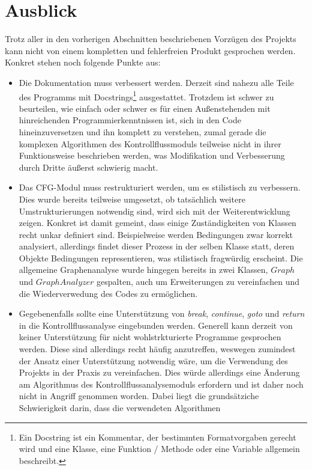 \documentclass[11pt]{article}
\begin{document}
\section{Ausblick}
Trotz aller in den vorherigen Abschnitten beschriebenen Vorzügen des Projekts kann nicht von
einem kompletten und fehlerfreien Produkt gesprochen werden. Konkret stehen noch folgende Punkte aus:
\begin{itemize}
	\item{Die Dokumentation muss verbessert werden. Derzeit sind nahezu alle Teile des Programms
		mit Docstrings\footnote{Ein Docstring ist ein Kommentar, der bestimmten Formatvorgaben
		gerecht wird und eine Klasse, eine Funktion / Methode oder eine Variable allgemein beschreibt.
		}
		ausgestattet. Trotzdem ist schwer zu beurteilen, wie einfach oder schwer
		es für einen Außenstehenden mit hinreichenden Programmierkenntnissen ist, sich in den
		Code hineinzuversetzen und ihn komplett zu verstehen, zumal gerade die komplexen Algorithmen
		des Kontrollflussmoduls teilweise nicht in ihrer Funktionsweise beschrieben werden, was
		Modifikation und Verbesserung durch Dritte äußerst schwierig macht.
	}
	\item{Das CFG-Modul muss restrukturiert werden, um es stilistisch zu verbessern. Dies wurde
		bereits teilweise umgesetzt, ob tatsächlich weitere Umstrukturierungen notwendig sind,
		wird sich mit der Weiterentwicklung zeigen. Konkret ist damit gemeint, dass einige
		Zuständigkeiten von Klassen recht unkar definiert sind. Beispielweise werden Bedingungen
		zwar korrekt analysiert, allerdings findet dieser Prozess in der selben Klasse statt,
		deren Objekte Bedingungen representieren, was stilistisch fragwürdig erscheint. Die
		allgemeine Graphenanalyse wurde hingegen bereits in zwei Klassen, $Graph$ und $GraphAnalyzer$
		gespalten, auch um Erweiterungen zu vereinfachen und die Wiederverwedung des Codes
		zu ermöglichen.
	}
	\item{Gegebenenfalls sollte eine Unterstützung von \textit{break}, \textit{continue},
		\textit{goto} und \textit{return} in die Kontrollflussanalyse eingebunden werden.
		Generell kann derzeit von keiner Unterstützung für nicht wohlstrkturierte Programme
		gesprochen werden. Diese sind allerdings recht häufig anzutreffen, weswegen zumindest
		der Ansatz einer Unterstützung notwendig wäre, um die Verwendung des Projekts in der
		Praxis zu vereinfachen. Dies würde allerdings eine Änderung am Algorithmus des
		Kontrollflussanalysemoduls erfordern und ist daher noch nicht in Angriff genommen worden.
		Dabei liegt die grundsätziche Schwierigkeit darin, dass die verwendeten Algorithmen
}
\end{itemize}
\end{document}
